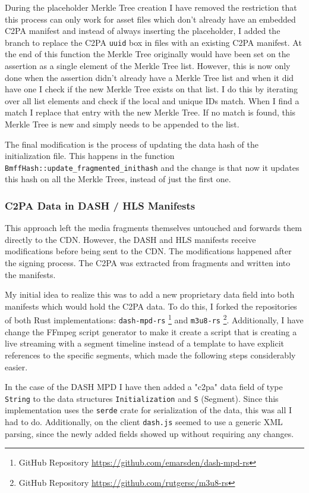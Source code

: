 During the placeholder Merkle Tree creation I have removed the restriction that this process can only work for asset files which don't already have an embedded C2PA manifest and instead of always inserting the placeholder, I added the branch to replace the C2PA \texttt{uuid} box in files with an existing C2PA manifest. At the end of this function the Merkle Tree originally would have been set on the assertion as a single element of the Merkle Tree list. However, this is now only done when the assertion didn't already have a Merkle Tree list and when it did have one I check if the new Merkle Tree exists on that list. I do this by iterating over all list elements and check if the local and unique IDs match. When I find a match I replace that entry with the new Merkle Tree. If no match is found, this Merkle Tree is new and simply needs to be appended to the list.

The final modification is the process of updating the data hash of the initialization file. This happens in the function \texttt{BmffHash::update\_fragmented\_inithash} and the change is that now it updates this hash on all the Merkle Trees, instead of just the first one.

\subsubsection{C2PA Data in DASH / HLS Manifests\label{sec:in_manifest}}

This approach left the media fragments themselves untouched and forwards them directly to the CDN. However, the DASH and HLS manifests receive modifications before being sent to the CDN. The modifications happened after the signing process. The C2PA was extracted from fragments and written into the manifests.

My initial idea to realize this was to add a new proprietary data field into both manifests which would hold the C2PA data. To do this, I forked the repositories of both Rust implementations: \texttt{dash-mpd-rs} \footnote{GitHub Repository \url{https://github.com/emarsden/dash-mpd-rs}} and \texttt{m3u8-rs} \footnote{GitHub Repository \url{https://github.com/rutgersc/m3u8-rs}}. Additionally, I have change the FFmpeg script generator to make it create a script that is creating a live streaming with a segment timeline instead of a template to have explicit references to the specific segments, which made the following steps considerably easier.

In the case of the DASH MPD I have then added a "c2pa" data field of type \texttt{String} to the data structures \texttt{Initialization} and \texttt{S} (Segment). Since this implementation uses the \texttt{serde} crate for serialization of the data, this was all I had to do. Additionally, on the client \texttt{dash.js} seemed to use a generic XML parsing, since the newly added fields showed up without requiring any changes.

